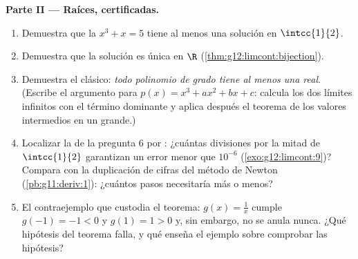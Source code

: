 \begin{problem}
\medskip
\noindent\textbf{Parte II --- Raíces, certificadas.}
\begin{enumerate}[resume]
  \item Demuestra que la  $x^3 + x = 5$ tiene al menos una solución
        en $\intcc{1}{2}$.
  \item Demuestra que la solución es única en $\R$
        (\cref{thm:g12:limcont:bijection}).
  \item Demuestra el clásico: \emph{todo polinomio de grado  tiene al
        menos una  real}. (Escribe el argumento para
        $p(x) = x^3 + a x^2 + b x + c$: calcula los dos límites infinitos
        con el término dominante y aplica después el teorema de los valores
        intermedios en un  grande.)
  \item Localizar la  de la pregunta 6 por : ¿cuántas
        divisiones por la mitad de $\intcc{1}{2}$ garantizan un error menor
        que $10^{-6}$ (\cref{exo:g12:limcont:9})? Compara con la
        duplicación de cifras del método de Newton
        (\cref{pb:g11:deriv:1}): ¿cuántos pasos necesitaría más o menos?
  \item El contraejemplo que custodia el teorema: $g(x) = \frac1x$ cumple
        $g(-1) = -1 < 0$ y $g(1) = 1 > 0$ y, sin embargo, no se anula
        nunca. ¿Qué hipótesis del teorema falla, y qué enseña el ejemplo
        sobre comprobar las hipótesis?
\end{enumerate}


\end{problem}

